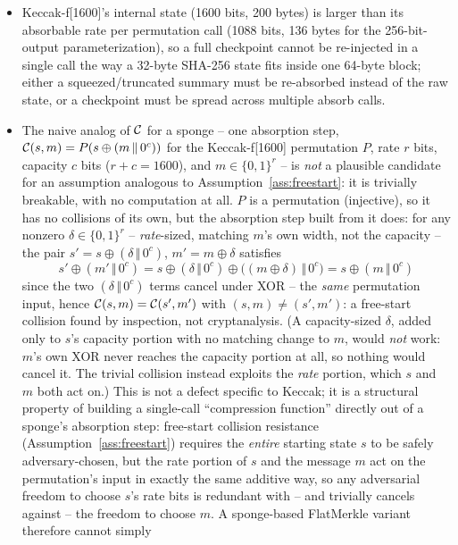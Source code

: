 \begin{itemize}
\item Keccak-f[1600]'s internal state (1600 bits, 200 bytes) is larger than
  its absorbable rate per permutation call (1088 bits, 136 bytes for the
  256-bit-output parameterization), so a full checkpoint cannot be
  re-injected in a single call the way a 32-byte SHA-256 state fits inside
  one 64-byte block; either a squeezed/truncated summary must be re-absorbed
  instead of the raw state, or a checkpoint must be spread across multiple
  absorb calls.
\item The naive analog of $\mathcal{C}$ for a sponge -- one absorption step,
  $\mathcal{C}(s,m) = P(s \oplus (m \,\Vert\, 0^c))$ for the Keccak-f[1600]
  permutation $P$, rate $r$ bits, capacity $c$ bits ($r+c=1600$), and
  $m \in \{0,1\}^r$ -- is \emph{not} a plausible candidate for an
  assumption analogous to Assumption~\ref{ass:freestart}: it is trivially
  breakable, with no computation at all. $P$ is a permutation (injective),
  so it has no collisions of its own, but the absorption step built from it
  does: for any nonzero $\delta \in \{0,1\}^{r}$ -- \emph{rate}-sized,
  matching $m$'s own width, not the capacity -- the pair
  $s' = s \oplus (\delta \,\Vert\, 0^{c})$, $m' = m \oplus \delta$ satisfies
  \[
  s' \oplus (m' \,\Vert\, 0^c) = s \oplus (\delta \,\Vert\, 0^c) \oplus
  \big((m \oplus \delta) \,\Vert\, 0^c\big) = s \oplus (m \,\Vert\, 0^c)
  \]
  since the two $(\delta \,\Vert\, 0^c)$ terms cancel under XOR -- the
  \emph{same} permutation input, hence $\mathcal{C}(s,m) = \mathcal{C}(s',m')$ with
  $(s,m) \ne (s',m')$: a free-start collision found by inspection, not
  cryptanalysis. (A capacity-sized $\delta$, added only to $s$'s capacity
  portion with no matching change to $m$, would \emph{not} work: $m$'s own
  XOR never reaches the capacity portion at all, so nothing would cancel
  it. The trivial collision instead exploits the \emph{rate} portion, which
  $s$ and $m$ both act on.) This is not a defect specific to Keccak; it is
  a structural property of building a single-call ``compression function''
  directly out of a sponge's absorption step: free-start collision
  resistance (Assumption~\ref{ass:freestart}) requires the \emph{entire}
  starting state $s$ to be safely adversary-chosen, but the rate portion of
  $s$ and the message $m$ act on the permutation's input in exactly the
  same additive way, so any adversarial freedom to choose $s$'s rate bits
  is redundant with -- and trivially cancels against -- the freedom to
  choose $m$. A sponge-based FlatMerkle variant therefore cannot simply

\end{itemize}
